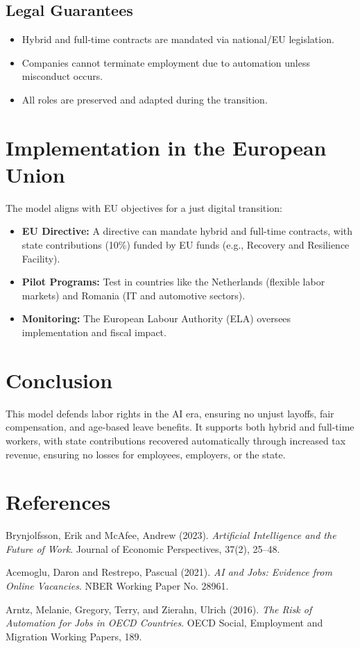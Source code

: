 \documentclass[12pt]{article}
\begin{document}
\subsection{Legal Guarantees}
\begin{itemize}
  \item Hybrid and full-time contracts are mandated via national/EU legislation.
  \item Companies cannot terminate employment due to automation unless misconduct occurs.
  \item All roles are preserved and adapted during the transition.
\end{itemize}

\section{Implementation in the European Union}
The model aligns with EU objectives for a just digital transition:
\begin{itemize}
  \item \textbf{EU Directive:} A directive can mandate hybrid and full-time contracts, with state contributions (10\%) funded by EU funds (e.g., Recovery and Resilience Facility).
  \item \textbf{Pilot Programs:} Test in countries like the Netherlands (flexible labor markets) and Romania (IT and automotive sectors).
  \item \textbf{Monitoring:} The European Labour Authority (ELA) oversees implementation and fiscal impact.
\end{itemize}

\section{Conclusion}
This model defends labor rights in the AI era, ensuring no unjust layoffs, fair compensation, and age-based leave benefits. It supports both hybrid and full-time workers, with state contributions recovered automatically through increased tax revenue, ensuring no losses for employees, employers, or the state.

\section*{References}
\begin{thebibliography}{9}
Brynjolfsson, Erik and McAfee, Andrew (2023). \textit{Artificial Intelligence and the Future of Work}. Journal of Economic Perspectives, 37(2), 25--48.

Acemoglu, Daron and Restrepo, Pascual (2021). \textit{AI and Jobs: Evidence from Online Vacancies}. NBER Working Paper No. 28961.

Arntz, Melanie, Gregory, Terry, and Zierahn, Ulrich (2016). \textit{The Risk of Automation for Jobs in OECD Countries}. OECD Social, Employment and Migration Working Papers, 189.
\end{thebibliography}
\end{document}
